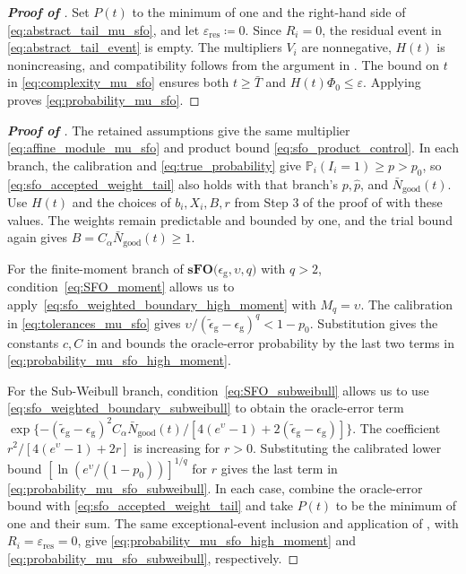 \documentclass{article}
\begin{document}
\begin{proof}[\textbf{Proof of }]
Set \(P(t)\) to the minimum of one and the right-hand side of
\eqref{eq:abstract_tail_mu_sfo}, and let
\(\varepsilon_{\mathrm{res}}\coloneqq 0\).
Since \(R_i=0\), the residual event in
\eqref{eq:abstract_tail_event} is empty.
The multipliers \(V_i\) are nonnegative, \(H(t)\) is nonincreasing,
and compatibility follows from
the argument in .
The bound on \(t\) in \eqref{eq:complexity_mu_sfo} ensures both
\(t\ge\bar T\) and \(H(t)\Phi_0\le\varepsilon\).
Applying  proves \eqref{eq:probability_mu_sfo}.
\end{proof}

\begin{proof}[\textbf{Proof of }]
\label{proof:mu_pos_sfo_tail_refinements}
The retained assumptions give the same multiplier
\eqref{eq:affine_module_mu_sfo} and product bound
\eqref{eq:sfo_product_control}. In each branch, the calibration and
\eqref{eq:true_probability} give \(\mathbb P_i(I_i=1)\ge p>p_0\), so
\eqref{eq:sfo_accepted_weight_tail} also holds with that branch's
\(p,\hat p\), and \(\bar N_{\mathrm{good}}(t)\).
Use \(H(t)\) and the choices of \(b_i,X_i,B,r\) from Step 3 of the
proof of  with these values. The weights remain predictable
and bounded by one, and the trial bound again gives
\(B=C_\alpha\bar N_{\mathrm{good}}(t)\ge1\).

For the finite-moment branch of \(\textbf{sFO(}\epsilon_{\mathrm g},\upsilon,q\textbf{)}\) with \(q>2\), condition~\eqref{eq:SFO_moment} allows us to apply~\eqref{eq:sfo_weighted_boundary_high_moment} with \(M_q=\upsilon\).
The calibration in \eqref{eq:tolerances_mu_sfo} gives
\(\upsilon/(\widetilde\epsilon_{\mathrm{g}}-\epsilon_{\mathrm{g}})^q<1-p_0\).
Substitution gives the constants \(c,C\) in
 and bounds the oracle-error probability
by the last two terms in \eqref{eq:probability_mu_sfo_high_moment}.

For the Sub-Weibull branch, condition~\eqref{eq:SFO_subweibull} allows us to use \eqref{eq:sfo_weighted_boundary_subweibull} to obtain the oracle-error term
\(\exp\{-(\widetilde\epsilon_{\mathrm{g}}-\epsilon_{\mathrm{g}})^2
C_\alpha\bar N_{\mathrm{good}}(t)/
[4(e^\upsilon-1)+2(\widetilde\epsilon_{\mathrm{g}}-\epsilon_{\mathrm{g}})]\}\).
The coefficient \(r^2/[4(e^\upsilon-1)+2r]\) is increasing for
\(r>0\). Substituting the calibrated lower bound
\([\ln(e^\upsilon/(1-p_0))]^{1/q}\) for \(r\) gives the last term
in \eqref{eq:probability_mu_sfo_subweibull}.
In each case, combine the oracle-error bound with
\eqref{eq:sfo_accepted_weight_tail} and take \(P(t)\) to be the minimum
of one and their sum. The same exceptional-event inclusion and
application of , with
\(R_i=\varepsilon_{\mathrm{res}}=0\), give
\eqref{eq:probability_mu_sfo_high_moment} and
\eqref{eq:probability_mu_sfo_subweibull}, respectively.
\end{proof}
\end{document}

